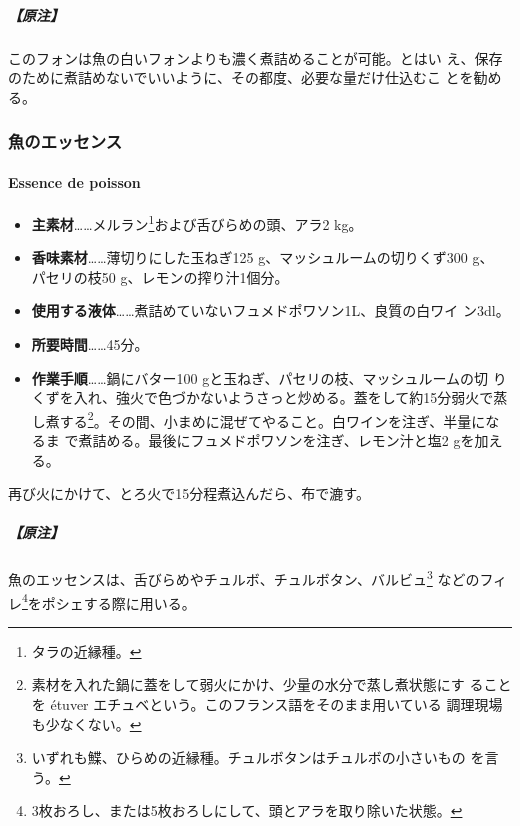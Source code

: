 \begin{recette}
\hypertarget{nota-fonds-de-poisson-au-vin-rouge}{%
\subparagraph{【原注】}\label{nota-fonds-de-poisson-au-vin-rouge}}

このフォンは魚の白いフォンよりも濃く煮詰めることが可能。とはい
え、保存のために煮詰めないでいいように、その都度、必要な量だけ仕込むこ
とを勧める。

\maeaki

\hypertarget{essencedepoisson}{%
\subsubsection{魚のエッセンス}\label{essencedepoisson}}

\hypertarget{essence-de-poisson}{%
\paragraph{Essence de poisson}\label{essence-de-poisson}}


\begin{itemize}
\item
  \textbf{主素材}\ldots{}\ldots{}メルラン\footnote{タラの近縁種。}および舌びらめの頭、アラ2
  kg。
\item
  \textbf{香味素材}\ldots{}\ldots{}薄切りにした玉ねぎ125
  g、マッシュルームの切りくず300 g、 パセリの枝50
  g、レモンの搾り汁1個分。
\item
  \textbf{使用する液体}\ldots{}\ldots{}煮詰めていないフュメドポワソン1\undemi{}L、良質の白ワイ
  ン3dl。
\item
  \textbf{所要時間}\ldots{}\ldots{}45分。
\item
  \textbf{作業手順}\ldots{}\ldots{}鍋にバター100
  gと玉ねぎ、パセリの枝、マッシュルームの切
  りくずを入れ、強火で色づかないようさっと炒める。蓋をして約15分弱火で蒸
  し煮する\footnote{素材を入れた鍋に蓋をして弱火にかけ、少量の水分で蒸し煮状態にす
    ることを étuver エチュベという。このフランス語をそのまま用いている
    調理現場も少なくない。}。その間、小まめに混ぜてやること。白ワインを注ぎ、半量になるま
  で煮詰める。最後にフュメドポワソンを注ぎ、レモン汁と塩2 gを加える。
\end{itemize}

再び火にかけて、とろ火で15分程煮込んだら、布で漉す。

\hypertarget{nota-essence-de-poisson}{%
\subparagraph{【原注】}\label{nota-essence-de-poisson}}

魚のエッセンスは、舌びらめやチュルボ、チュルボタン、バルビュ\footnote{いずれも鰈、ひらめの近縁種。チュルボタンはチュルボの小さいもの
  を言う。} などのフィレ\footnote{3枚おろし、または5枚おろしにして、頭とアラを取り除いた状態。}をポシェする際に用いる。


\end{recette}
